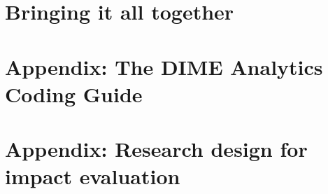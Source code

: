 


\chapter*{Bringing it all together} %




\chapter{Appendix: The DIME Analytics Coding Guide}
\label{ap:1}





\chapter{Appendix: Research design for impact evaluation}
\label{ap:1}




\backmatter




\printindex %


